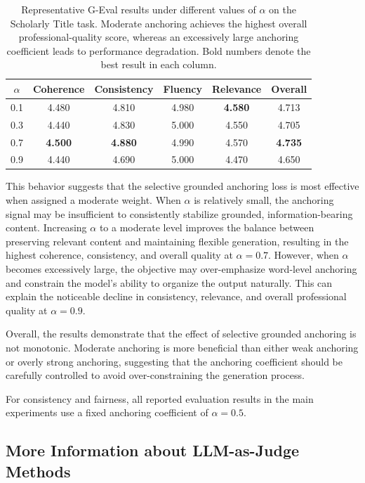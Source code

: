 \documentclass{article} %
\begin{document}
\begin{table}
\centering
\small
\caption{Representative G-Eval results under different values of
$\alpha$ on the Scholarly Title task. Moderate anchoring achieves the
highest overall professional-quality score, whereas an excessively large
anchoring coefficient leads to performance degradation. Bold numbers denote
the best result in each column.}
\label{tab:alpha_quality}
\begin{tabular}{c|ccccc}
\toprule
$\alpha$
& Coherence
& Consistency
& Fluency
& Relevance
& Overall \\
\midrule
0.1
& 4.480
& 4.810
& 4.980
& \textbf{4.580}
& 4.713 \\
0.3
& 4.440
& 4.830
& 5.000
& 4.550
& 4.705 \\
0.7
& \textbf{4.500}
& \textbf{4.880}
& 4.990
& 4.570
& \textbf{4.735} \\
0.9
& 4.440
& 4.690
& 5.000
& 4.470
& 4.650 \\
\bottomrule
\end{tabular}
\end{table}

This behavior suggests that the selective grounded anchoring loss is most
effective when assigned a moderate weight. When $\alpha$ is relatively
small, the anchoring signal may be insufficient to consistently stabilize
grounded, information-bearing content. Increasing $\alpha$ to a moderate
level improves the balance between preserving relevant content and
maintaining flexible generation, resulting in the highest coherence,
consistency, and overall quality at $\alpha=0.7$. However, when $\alpha$
becomes excessively large, the objective may over-emphasize word-level
anchoring and constrain the model's ability to organize the output
naturally. This can explain the noticeable decline in consistency,
relevance, and overall professional quality at $\alpha=0.9$.

Overall, the results demonstrate that the effect of selective grounded
anchoring is not monotonic. Moderate anchoring is more beneficial than
either weak anchoring or overly strong anchoring, suggesting that the
anchoring coefficient should be carefully controlled to avoid
over-constraining the generation process.

For consistency and fairness, all reported evaluation results in the
main experiments use a fixed anchoring coefficient of $\alpha=0.5$.
\subsection{More Information about LLM-as-Judge Methods}
\label{app:llm_as_judge}
\end{document}
